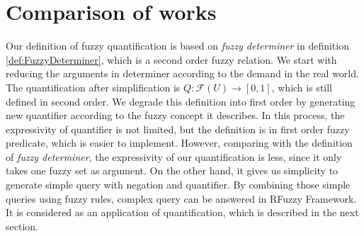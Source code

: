 \section{Comparison of works}
\label{sec:ComparisonQuantification}
Our definition of fuzzy quantification is based on \textit{fuzzy determiner} in definition \ref{def:FuzzyDeterminer}, which is a second order fuzzy relation. We start with reducing the arguments in determiner according to the demand in the real world. The quantification after simplification is $Q : \mathcal{F}(U)\rightarrow [0,1]$, which is still defined in second order. We degrade this definition into first order by generating new quantifier according to the fuzzy concept it describes. In this process, the expressivity of quantifier is not limited, but the definition is in first order fuzzy predicate, which is easier to implement. However, comparing with the definition of \textit{fuzzy determiner}, the expressivity of our quantification is less, since it only takes one fuzzy set as argument. On the other hand, it gives us simplicity to generate simple query with negation and quantifier. By combining those simple queries using fuzzy rules, complex query can be answered in RFuzzy Framework. It is considered as an application of quantification, which is described in the next section.